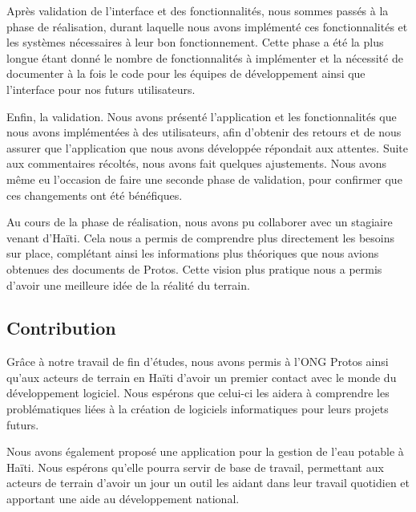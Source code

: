 \documentclass{EPL-master-thesis-covers-FR}
\begin{document}
			Après validation de l'interface et des fonctionnalités, nous sommes passés à la phase de réalisation, durant laquelle nous avons implémenté ces fonctionnalités et les systèmes nécessaires à leur bon fonctionnement. Cette phase a été la plus longue étant donné le nombre de fonctionnalités à implémenter et la nécessité de documenter à la fois le code pour les équipes de développement ainsi que l'interface pour nos futurs utilisateurs.

			Enfin, la validation. Nous avons présenté l'application et les fonctionnalités que nous avons implémentées à des utilisateurs, afin d'obtenir des retours et de nous assurer que l'application que nous avons développée répondait aux attentes. Suite aux commentaires récoltés, nous avons fait quelques ajustements. Nous avons même eu l'occasion de faire une seconde phase de validation, pour confirmer que ces changements ont été bénéfiques. %

			Au cours de la phase de réalisation, nous avons pu collaborer avec un stagiaire venant d'Haïti. Cela nous a permis de comprendre plus directement les besoins sur place, complétant ainsi les informations plus théoriques que nous avions obtenues des documents de Protos. Cette vision plus pratique nous a permis d'avoir une meilleure idée de la réalité du terrain.

		\subsection*{Contribution}

			Grâce à notre travail de fin d'études, nous avons permis à l'ONG Protos ainsi qu'aux acteurs de terrain en Haïti d'avoir un premier contact avec le monde du développement logiciel. Nous espérons que celui-ci les aidera à comprendre les problématiques liées à la création de logiciels informatiques pour leurs projets futurs.

			Nous avons également proposé une application pour la gestion de l'eau potable à Haïti. Nous espérons qu'elle pourra servir de base de travail, permettant aux acteurs de terrain d'avoir un jour un outil les aidant dans leur travail quotidien et apportant une aide au développement national.
\end{document}
